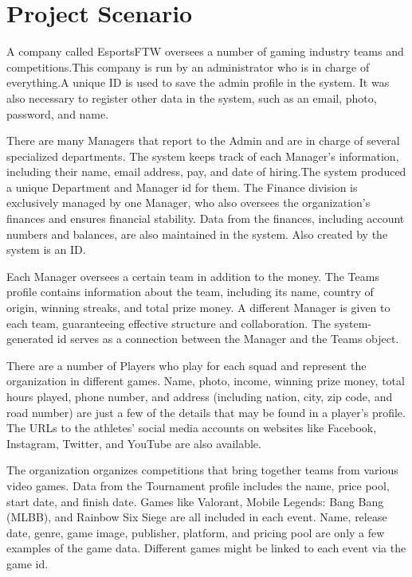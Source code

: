 \clearpage

\section{Project Scenario}
\hrulefill
\vspace*{12pt}

A company called EsportsFTW oversees a number of gaming industry teams and competitions.This company is run by an administrator who is in charge of everything.A unique ID is used to save the admin profile in the system. It was also necessary to register other data in the system, such as an email, photo, password, and name.

There are many Managers that report to the Admin and are in charge of several specialized departments. The system keeps track of each Manager's information, including their name, email address, pay, and date of hiring.The system produced a unique Department and Manager id for them. The Finance division is exclusively managed by one Manager, who also oversees the organization's finances and ensures financial stability. Data from the finances, including account numbers and balances, are also maintained in the system. Also created by the system is an ID.

Each Manager oversees a certain team in addition to the money. The Teams profile contains information about the team, including its name, country of origin, winning streaks, and total prize money. A different Manager is given to each team, guaranteeing effective structure and collaboration. The system-generated id serves as a connection between the Manager and the Teams object.

There are a number of Players who play for each squad and represent the organization in different games. Name, photo, income, winning prize money, total hours played, phone number, and address (including nation, city, zip code, and road number) are just a few of the details that may be found in a player's profile. The URLs to the athletes' social media accounts on websites like Facebook, Instagram, Twitter, and YouTube are also available.


The organization organizes competitions that bring together teams from various video games. Data from the Tournament profile includes the name, price pool, start date, and finish date. Games like Valorant, Mobile Legends: Bang Bang (MLBB), and Rainbow Six Siege are all included in each event. Name, release date, genre, game image, publisher, platform, and pricing pool are only a few examples of the game data. Different games might be linked to each event via the game id.

